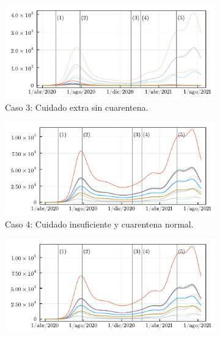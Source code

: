 \begin{figure}
     \centering
     \begin{subfigure}[b]{.47\textwidth}
         \centering
         \includegraphics[width=\textwidth]{img/resultados/comparecase_3withnormal_I_gamma_e_0-1724_gamma_i_0-0833_beta_2_2-0000.pdf}
         \caption{Caso \(3\): Cuidado extra sin cuarentena.}
     \end{subfigure}
     \hfill
     \begin{subfigure}[b]{.47\textwidth}
         \centering
         \includegraphics[width=\textwidth]{img/resultados/comparecase_4withnormal_I_gamma_e_0-1724_gamma_i_0-0833_beta_2_2-0000.pdf}
         \caption{Caso \(4\): Cuidado insuficiente y cuarentena normal.}
     \end{subfigure}
     \hfill
     \begin{subfigure}[b]{.47\textwidth}
         \centering
         \includegraphics[width=\textwidth]{img/resultados/comparecase_7withnormal_I_gamma_e_0-1724_gamma_i_0-0833_beta_2_2-0000.pdf}

\end{subfigure}
\end{figure}

